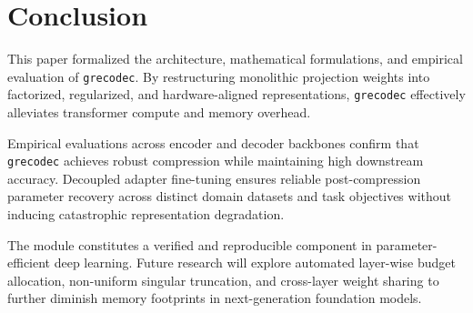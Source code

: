 \section{Conclusion}
This paper formalized the architecture, mathematical formulations, and empirical evaluation of \texttt{grecodec}. By restructuring monolithic projection weights into factorized, regularized, and hardware-aligned representations, \texttt{grecodec} effectively alleviates transformer compute and memory overhead.

Empirical evaluations across encoder and decoder backbones confirm that \texttt{grecodec} achieves robust compression while maintaining high downstream accuracy. Decoupled adapter fine-tuning ensures reliable post-compression parameter recovery across distinct domain datasets and task objectives without inducing catastrophic representation degradation.

The module constitutes a verified and reproducible component in parameter-efficient deep learning. Future research will explore automated layer-wise budget allocation, non-uniform singular truncation, and cross-layer weight sharing to further diminish memory footprints in next-generation foundation models.
